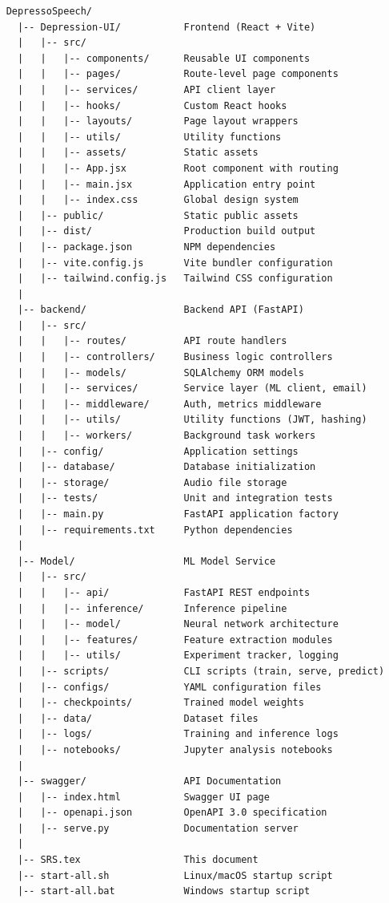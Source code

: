 \documentclass[12pt]{article}
\begin{document}
	\begin{verbatim}
	DepressoSpeech/
	  |-- Depression-UI/           Frontend (React + Vite)
	  |   |-- src/
	  |   |   |-- components/      Reusable UI components
	  |   |   |-- pages/           Route-level page components
	  |   |   |-- services/        API client layer
	  |   |   |-- hooks/           Custom React hooks
	  |   |   |-- layouts/         Page layout wrappers
	  |   |   |-- utils/           Utility functions
	  |   |   |-- assets/          Static assets
	  |   |   |-- App.jsx          Root component with routing
	  |   |   |-- main.jsx         Application entry point
	  |   |   |-- index.css        Global design system
	  |   |-- public/              Static public assets
	  |   |-- dist/                Production build output
	  |   |-- package.json         NPM dependencies
	  |   |-- vite.config.js       Vite bundler configuration
	  |   |-- tailwind.config.js   Tailwind CSS configuration
	  |
	  |-- backend/                 Backend API (FastAPI)
	  |   |-- src/
	  |   |   |-- routes/          API route handlers
	  |   |   |-- controllers/     Business logic controllers
	  |   |   |-- models/          SQLAlchemy ORM models
	  |   |   |-- services/        Service layer (ML client, email)
	  |   |   |-- middleware/      Auth, metrics middleware
	  |   |   |-- utils/           Utility functions (JWT, hashing)
	  |   |   |-- workers/         Background task workers
	  |   |-- config/              Application settings
	  |   |-- database/            Database initialization
	  |   |-- storage/             Audio file storage
	  |   |-- tests/               Unit and integration tests
	  |   |-- main.py              FastAPI application factory
	  |   |-- requirements.txt     Python dependencies
	  |
	  |-- Model/                   ML Model Service
	  |   |-- src/
	  |   |   |-- api/             FastAPI REST endpoints
	  |   |   |-- inference/       Inference pipeline
	  |   |   |-- model/           Neural network architecture
	  |   |   |-- features/        Feature extraction modules
	  |   |   |-- utils/           Experiment tracker, logging
	  |   |-- scripts/             CLI scripts (train, serve, predict)
	  |   |-- configs/             YAML configuration files
	  |   |-- checkpoints/         Trained model weights
	  |   |-- data/                Dataset files
	  |   |-- logs/                Training and inference logs
	  |   |-- notebooks/           Jupyter analysis notebooks
	  |
	  |-- swagger/                 API Documentation
	  |   |-- index.html           Swagger UI page
	  |   |-- openapi.json         OpenAPI 3.0 specification
	  |   |-- serve.py             Documentation server
	  |
	  |-- SRS.tex                  This document
	  |-- start-all.sh             Linux/macOS startup script
	  |-- start-all.bat            Windows startup script
	\end{verbatim}
\end{document}
